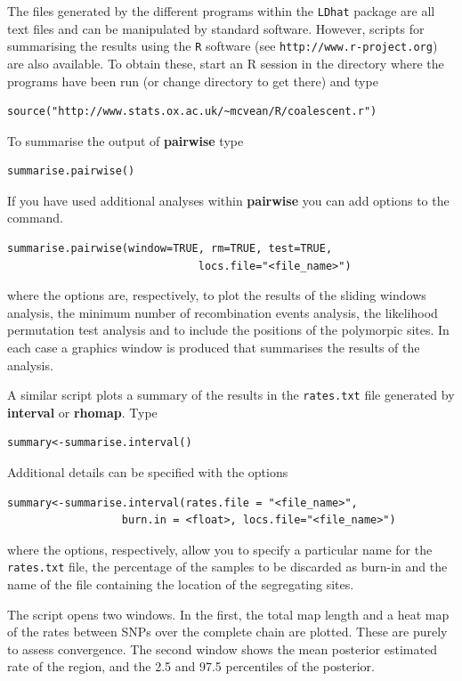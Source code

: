 \documentclass[a4paper,10pt,fullpage]{article}
\begin{document}
The files generated by the different programs within the \verb+LDhat+ package are all text files and can be manipulated by standard software.  However, scripts for summarising the results using the \verb+R+ software (see \verb+http://www.r-project.org+) are also available.  To obtain these, start an R session in the directory where the programs have been run (or change directory to get there) and type
\begin{verbatim}
source("http://www.stats.ox.ac.uk/~mcvean/R/coalescent.r")
\end{verbatim}
To summarise the output of {\bf pairwise} type
\begin{verbatim}
summarise.pairwise()
\end{verbatim}
\noindent If you have used additional analyses within {\bf pairwise} you can add options to the command.
\begin{verbatim}
summarise.pairwise(window=TRUE, rm=TRUE, test=TRUE, 
                              locs.file="<file_name>")
\end{verbatim}
\noindent where the options are, respectively, to plot the results of the sliding windows analysis, the minimum number of recombination events analysis, the likelihood permutation test analysis and to include the positions of the polymorpic sites.  In each case a graphics window is produced that summarises the results of the analysis.

A similar script plots a summary of the results in the \verb+rates.txt+ file generated by {\bf interval} or {\bf rhomap}.  Type 
\begin{verbatim}
summary<-summarise.interval()
\end{verbatim}
\noindent Additional details can be specified with the options 
\begin{verbatim} 
summary<-summarise.interval(rates.file = "<file_name>", 
                  burn.in = <float>, locs.file="<file_name>")
\end{verbatim}


\noindent where the options, respectively, allow you to specify a particular name for the \verb+rates.txt+ file, the percentage of the samples to be discarded as burn-in and the name of the file containing the location of the segregating sites.

The script opens two windows.  In the first, the total map length and a heat map of the rates between SNPs over the complete chain are plotted.  These are purely to assess convergence.  The second window shows the mean posterior estimated rate of the region, and the 2.5 and 97.5 percentiles of the posterior.
\end{document}
